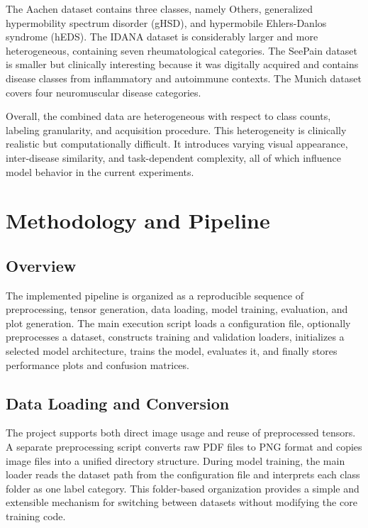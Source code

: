 \documentclass[12pt]{report}
\begin{document}
The Aachen dataset contains three classes, namely Others, generalized hypermobility spectrum disorder (gHSD), and hypermobile Ehlers-Danlos syndrome (hEDS). The IDANA dataset is considerably larger and more heterogeneous, containing seven rheumatological categories. The SeePain dataset is smaller but clinically interesting because it was digitally acquired and contains disease classes from inflammatory and autoimmune contexts. The Munich dataset covers four neuromuscular disease categories.

Overall, the combined data are heterogeneous with respect to class counts, labeling granularity, and acquisition procedure. This heterogeneity is clinically realistic but computationally difficult. It introduces varying visual appearance, inter-disease similarity, and task-dependent complexity, all of which influence model behavior in the current experiments.

\chapter{Methodology and Pipeline}

\section{Overview}

The implemented pipeline is organized as a reproducible sequence of preprocessing, tensor generation, data loading, model training, evaluation, and plot generation. The main execution script loads a configuration file, optionally preprocesses a dataset, constructs training and validation loaders, initializes a selected model architecture, trains the model, evaluates it, and finally stores performance plots and confusion matrices.

\section{Data Loading and Conversion}

The project supports both direct image usage and reuse of preprocessed tensors. A separate preprocessing script converts raw PDF files to PNG format and copies image files into a unified directory structure. During model training, the main loader reads the dataset path from the configuration file and interprets each class folder as one label category. This folder-based organization provides a simple and extensible mechanism for switching between datasets without modifying the core training code.
\end{document}

